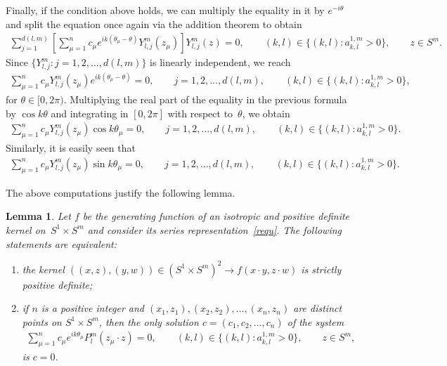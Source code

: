 \documentclass[pdftex]{sigma}
\numberwithin{equation}{section}
\newtheorem{Lemma}[Theorem]{Lemma}
\def\t{\theta}
\begin{document}
Finally, if the condition above holds, we can multiply the equality in it by $e^{-i\t}$ and split the equation once again via the addition theorem
to obtain
\begin{gather*}
\sum_{j=1}^{d(l,m)} \left[\sum_{\mu=1}^n c_\mu e^{i k(\t_\mu-\t)} Y_{l,j}^m(z_\mu)\right]Y_{l,j}^m(z)=0, \qquad (k,l)\in \big\{(k,l)\colon a_{k,l}^{1,m}>0\big\}, \qquad z \in S^m.
\end{gather*}
Since $\{Y_{l,j}^m \colon j=1,2,\ldots,d(l,m)\}$ is linearly independent, we reach
\begin{gather*}
\sum_{\mu=1}^n c_\mu Y_{l,j}^m(z_\mu)e^{i k(\t_\mu-\t)}=0,\qquad j=1,2,\ldots,d(l,m),\qquad (k,l)\in \big\{(k,l)\colon a_{k,l}^{1,m}>0\big\},
\end{gather*}
for $\t\in[0,2\pi)$. Multiplying the real part of the equality in the previous formula by $\cos k\t$ and integrating in $[0,2\pi]$ with respect to~$\t$, we obtain
\begin{gather*}
\sum_{\mu=1}^n c_\mu Y_{l,j}^m(z_\mu)\cos k\t_\mu = 0,\qquad j=1,2,\ldots,d(l,m),\qquad (k,l)\in \big\{(k,l)\colon a_{k,l}^{1,m}>0\big\}.
\end{gather*}
Similarly, it is easily seen that
\begin{gather*}
\sum_{\mu=1}^n c_\mu Y_{l,j}^m(z_\mu)\sin k\t_\mu=0,\qquad j=1,2,\ldots,d(l,m),\qquad (k,l)\in \big\{(k,l)\colon a_{k,l}^{1,m}>0\big\}.
\end{gather*}

The above computations justify the following lemma.

\begin{Lemma} \label{t-alternativa-spd}
Let $f$ be the generating function of an isotropic and positive definite kernel on~\mbox{$S^1 \times S^m$} and consider its series representation~\eqref{requ}. The following statements are equivalent:
\begin{enumerate}\itemsep=0pt
\item[$(i)$] the kernel $((x,z), (y,w)) \in (S^1 \times S^m)^2 \to f(x \cdot y, z \cdot w)$ is strictly positive definite;
\item[$(ii)$] if $n$ is a positive integer and $(x_1,z_1),(x_2,z_2), \ldots, (x_n,z_n)$ are distinct points on $S^1\times S^{m}$, then the only solution $c=(c_1,c_2, \ldots, c_n)$ of the system
\begin{gather*}
\sum_{\mu=1}^n c_\mu e^{ik\t_\mu} P_l^m(z_\mu\cdot z)=0,\qquad (k,l)\in \big\{(k,l)\colon a_{k,l}^{1,m}>0\big\}, \qquad z\in S^m,
\end{gather*}
is $c=0$.
\end{enumerate}
\end{Lemma}
\end{document}

